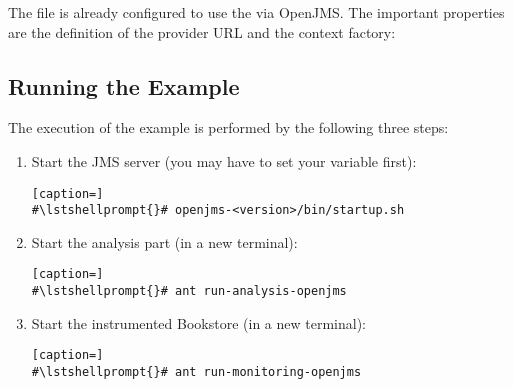 The file  %
is already configured to use the  via OpenJMS. The important properties are %
the definition of the provider URL and the context factory:

\setPropertiesListing


\setPropertiesListing


\subsection{Running the Example}

 The execution of the example is performed by the following three steps:
\begin{enumerate}
\item Start the JMS server (you may have to set your  variable first):

\setBashListing
\begin{lstlisting}[caption=]
#\lstshellprompt{}# openjms-<version>/bin/startup.sh
\end{lstlisting}
\item Start the analysis part (in a new terminal):
\setBashListing
\begin{lstlisting}[caption=]
#\lstshellprompt{}# ant run-analysis-openjms
\end{lstlisting}
\item Start the instrumented Bookstore (in a new terminal):
\setBashListing
\begin{lstlisting}[caption=]
#\lstshellprompt{}# ant run-monitoring-openjms
\end{lstlisting}
\end{enumerate}
